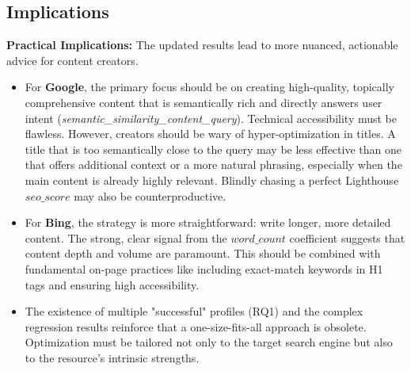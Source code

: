 \documentclass[a4paper,fleqn]{cas-sc}
\newcommand{\longvar}[1]{\textit{#1}}
\begin{document}
\subsection{Implications}
\label{subsec:discussion_implications}
\textbf{Practical Implications:} The updated results lead to more nuanced, actionable advice for content creators.
\begin{itemize}
    \item For \textbf{Google}, the primary focus should be on creating high-quality, topically comprehensive content that is semantically rich and directly answers user intent (\longvar{semantic_similarity_content_query}). Technical accessibility must be flawless. However, creators should be wary of hyper-optimization in titles. A title that is too semantically close to the query may be less effective than one that offers additional context or a more natural phrasing, especially when the main content is already highly relevant. Blindly chasing a perfect Lighthouse $seo\_score$ may also be counterproductive.
    \item For \textbf{Bing}, the strategy is more straightforward: write longer, more detailed content. The strong, clear signal from the $word\_count$ coefficient suggests that content depth and volume are paramount. This should be combined with fundamental on-page practices like including exact-match keywords in H1 tags and ensuring high accessibility.
    \item The existence of multiple "successful" profiles (RQ1) and the complex regression results reinforce that a one-size-fits-all approach is obsolete. Optimization must be tailored not only to the target search engine but also to the resource's intrinsic strengths.
\end{itemize}
\end{document}
